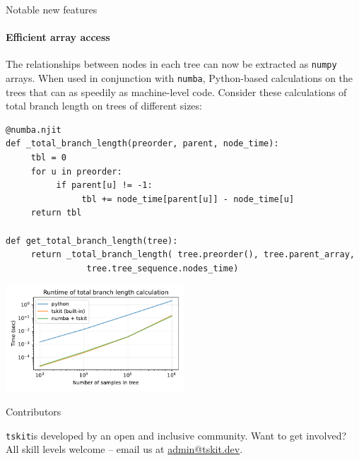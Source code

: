 \documentclass[landscape,a0paper,fontscale=0.5]{baposter}
\newcommand{\tskit}{{\texttt{tskit}}}
\begin{document}
\begin{poster}
\begin{posterbox}[name=operations,column=3,below=stats,span=1]{Notable new features}
\paragraph{Efficient array access}
The relationships between nodes in each tree can now be extracted as \texttt{numpy}
    arrays. When used in conjunction with \texttt{numba},
    Python-based calculations on the trees that can as speedily as
    machine-level code. Consider these calculations of total branch length on
    trees of different sizes:

\begin{multicols}{2}
\begin{verbatim}
@numba.njit
def _total_branch_length(preorder, parent, node_time):
     tbl = 0
     for u in preorder:
          if parent[u] != -1:
               tbl += node_time[parent[u]] - node_time[u]
     return tbl

def get_total_branch_length(tree):
     return _total_branch_length( tree.preorder(), tree.parent_array,
                tree.tree_sequence.nodes_time)
\end{verbatim}

\includegraphics[width=0.5\textwidth]{numba_runtime}
\end{multicols}

\end{posterbox}



\begin{posterbox}[name=refs,column=2,above=bottom]{Contributors}

    \tskit is developed by an open and inclusive community.
    Want to get involved?
    All skill levels welcome -- email us at \url{admin@tskit.dev}.


\end{posterbox}
\end{poster}
\end{document}
